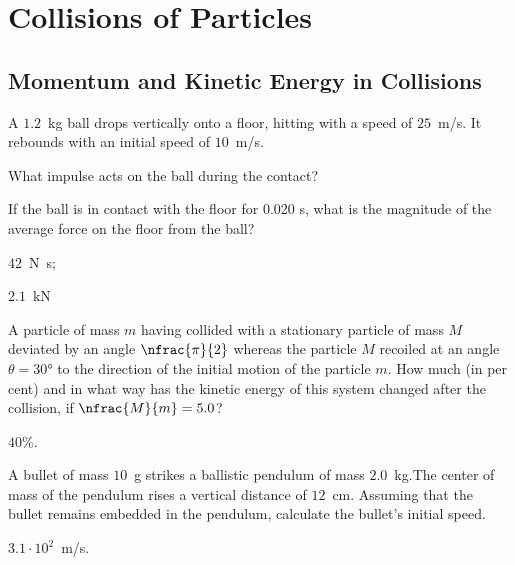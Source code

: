 \section{Collisions of Particles}

\subsection{Momentum and Kinetic Energy in Collisions}

\begin{problem}
	A $1.2$~kg ball drops vertically onto a floor, hitting with a speed of $25$~m/s. It rebounds with an initial speed of $10$~m/s.
	\begin{enumerate*}[label=(\alph*)]
		\item What impulse acts on the ball during the contact?
		\item If the ball is in contact with the floor for 0.020 s, what is the magnitude of the average force on the floor from the ball?
	\end{enumerate*}
	\begin{solution}
		\begin{enumerate*}[label=(\alph*)]
			\item $42$~\si{\newton\second};
			\item $2.1$~kN
		\end{enumerate*}
	\end{solution}
\end{problem}

\begin{problem}
	A particle of mass $m$ having collided with a stationary particle of mass $M$ deviated by an angle $\nfrac{\pi}{2}$ whereas the particle $M$ recoiled at an angle $\theta = \ang{30}$ to the direction of the initial motion of the particle $m$. How much (in per cent) and in what way has the kinetic energy of this system changed after the collision, if $\nfrac{M}{m} = 5.0$?
	\begin{solution}
		$40\%$.
	\end{solution}
\end{problem}


\begin{problem}
	A bullet of mass $10$~g strikes a ballistic pendulum of mass $2.0$~kg.The center of mass of the pendulum rises a vertical distance of $12$~cm. Assuming that the bullet remains embedded in the pendulum, calculate the bullet's initial speed.
	\begin{solution}
		$3.1 \cdot 10^2$~m/s.
	\end{solution}
\end{problem}

